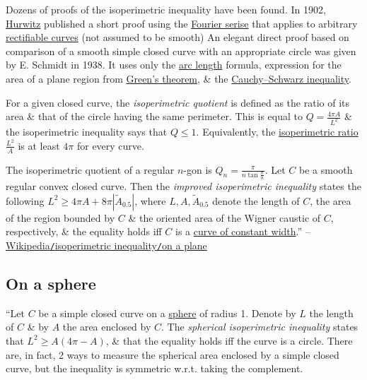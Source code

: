 \documentclass[oneside]{book}
\numberwithin{equation}{section}
\begin{document}
Dozens of proofs of the isoperimetric inequality have been found. In 1902, \href{https://en.wikipedia.org/wiki/Adolf_Hurwitz}{Hurwitz} published a short proof using the \href{https://en.wikipedia.org/wiki/Fourier_series}{Fourier serise} that applies to arbitrary \href{https://en.wikipedia.org/wiki/Rectifiable_curve}{rectifiable curves} (not assumed to be smooth) An elegant direct proof based on comparison of a smooth simple closed curve with an appropriate circle was given by E. Schmidt in 1938. It uses only the \href{https://en.wikipedia.org/wiki/Arc_length}{arc length} formula, expression for the area of a plane region from \href{https://en.wikipedia.org/wiki/Green%27s_theorem}{Green's theorem}, \& the \href{https://en.wikipedia.org/wiki/Cauchy%E2%80%93Schwarz_inequality}{Cauchy--Schwarz inequality}.

For a given closed curve, the \textit{isoperimetric quotient} is defined as the ratio of its area \& that of the circle having the same perimeter. This is equal to $Q = \frac{4\pi A}{L^2}$ \& the isoperimetric inequality says that $Q\le 1$. Equivalently, the \href{https://en.wikipedia.org/wiki/Isoperimetric_ratio}{isoperimetric ratio} $\frac{L^2}{A}$ is at least $4\pi$ for every curve.

The isoperimetric quotient of a regular $n$-gon is $Q_n = \frac{\pi}{n\tan\frac{\pi}{n}}$. Let $C$ be a smooth regular convex closed curve. Then the \textit{improved isoperimetric inequality} states the following $L^2\ge 4\pi A + 8\pi|\widetilde{A}_{0.5}|$, where $L,A,\widetilde{A}_{0.5}$ denote the length of $C$, the area of the region bounded by $C$ \& the oriented area of the Wigner caustic of $C$, respectively, \& the equality holds iff $C$ is a \href{https://en.wikipedia.org/wiki/Curve_of_constant_width}{curve of constant width}.'' -- \href{https://en.wikipedia.org/wiki/Isoperimetric_inequality#On_a_plane}{Wikipedia\texttt{/}isoperimetric inequality\texttt{/}on a plane}

\subsection{On a sphere}
``Let $C$ be a simple closed curve on a \href{https://en.wikipedia.org/wiki/Sphere}{sphere} of radius 1. Denote by $L$ the length of $C$ \& by $A$ the area enclosed by $C$. The \textit{spherical isoperimetric inequality} states that $L^2\ge A(4\pi - A)$, \& that the equality holds iff the curve is a circle. There are, in fact, 2 ways to measure the spherical area enclosed by a simple closed curve, but the inequality is symmetric w.r.t. taking the complement.
\end{document}
